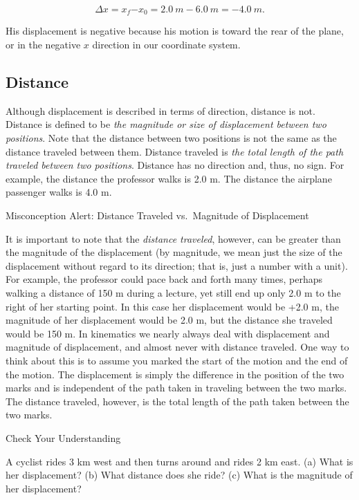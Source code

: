 \documentclass[
]{book}
\begin{document}
\leavevmode{}%
\[{{\Delta x = x_{f}{- x_{0}} = 2}\text{.}0\ m - 6\text{.}0\ m = {- 4}\text{.}0\ m}.\]

His displacement is negative because his motion is toward the rear of
the plane, or in the negative \(x{}\) direction in our coordinate system.

\hypertarget{fs-id1414454}{}
\hypertarget{distance}{%
\subsection{Distance}\label{distance}}

Although displacement is described in terms of direction, distance is
not. {Distance} is defined to be \emph{the magnitude or
size of displacement between two positions}. Note that the distance
between two positions is not the same as the distance traveled between
them. {Distance traveled} is \emph{the total length of the
path traveled between two positions}. Distance has no direction and,
thus, no sign. For example, the distance the professor walks is 2.0 m.
The distance the airplane passenger walks is 4.0 m.

\hypertarget{fs-id3044492}{}
Misconception Alert: Distance Traveled vs.~Magnitude of Displacement

It is important to note that the \emph{distance traveled},
\emph{}however, can be greater than the
magnitude of the displacement (by magnitude, we mean just the size of
the displacement without regard to its direction; that is, just a number
with a unit). For example, the professor could pace back and forth many
times, perhaps walking a distance of 150 m during a lecture, yet still
end up only 2.0 m to the right of her starting point. In this case her
displacement would be +2.0 m, the magnitude of her displacement would be
2.0 m, but the distance she traveled would be 150 m. In kinematics we
nearly always deal with displacement and magnitude of displacement, and
almost never with distance traveled. One way to think about this is to
assume you marked the start of the motion and the end of the motion. The
displacement is simply the difference in the position of the two marks
and is independent of the path taken in traveling between the two marks.
The distance traveled, however, is the total length of the path taken
between the two marks.

\hypertarget{fs-id3589986}{}
Check Your Understanding

\leavevmode{}%
A cyclist rides 3 km west and then turns around and rides 2 km east. (a)
What is her displacement? (b) What distance does she ride? (c) What is
the magnitude of her displacement?
\end{document}
